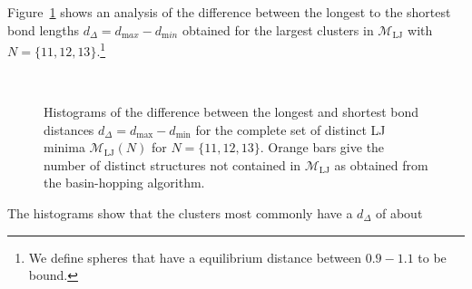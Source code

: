 Figure~\ref{fig:bondlength-variance} shows an analysis of the difference between
the longest to the shortest bond lengths $d_\Delta=d_{\mathrm max}-d_{\mathrm
min}$ obtained for the largest clusters in $\mathcal{M}_{\mathrm{LJ}}$ with
$N=\{11,12,13\}$.\footnote{We define spheres that have a equilibrium distance
between $0.9-1.1$ to be bound.}
%
\begin{figure}[htb]
    \centering
    \\
    \caption{Histograms of the difference between the longest and shortest bond
    distances $d_\Delta=d_\text{max}-d_\text{min}$ for the complete set of
    distinct LJ minima $\mathcal{M}_\text{LJ}(N)$ for $N=\{11,12,13\}$. Orange
    bars give the number of distinct structures not contained in
    $\mathcal{M}_\mathrm{LJ}$ as obtained from the basin-hopping algorithm.}
    \label{fig:bondlength-variance}
\end{figure}%
%
The histograms show that the clusters most commonly have a $d_\Delta$ of about

